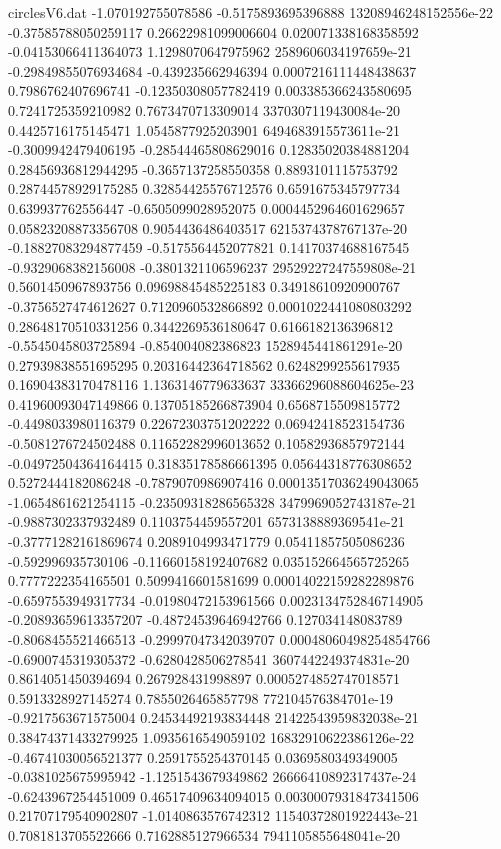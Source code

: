 \begin{filecontents}{circlesV6.dat}
-1.070192755078586	-0.5175893695396888	13208946248152556e-22
-0.37585788050259117	0.26622981099006604	0.020071338168358592
-0.04153066411364073	1.1298070647975962	2589606034197659e-21
-0.29849855076934684	-0.439235662946394	0.0007216111448438637
0.7986762407696741	-0.12350308057782419	0.003385366243580695
0.7241725359210982	0.7673470713309014	3370307119430084e-20
0.4425716175145471	1.0545877925203901	6494683915573611e-21
-0.3009942479406195	-0.28544465808629016	0.12835020384881204
0.28456936812944295	-0.3657137258550358	0.8893101115753792
0.28744578929175285	0.32854425576712576	0.6591675345797734
0.639937762556447	-0.6505099028952075	0.0004452964601629657
0.05823208873356708	0.9054436486403517	6215374378767137e-20
-0.18827083294877459	-0.5175564452077821	0.14170374688167545
-0.9329068382156008	-0.3801321106596237	29529227247559808e-21
0.5601450967893756	0.09698845485225183	0.34918610920900767
-0.3756527474612627	0.7120960532866892	0.0001022441080803292
0.28648170510331256	0.3442269536180647	0.6166182136396812
-0.5545045803725894	-0.854004082386823	1528945441861291e-20
0.27939838551695295	0.20316442364718562	0.6248299255617935
0.16904383170478116	1.1363146779633637	33366296088604625e-23
0.41960093047149866	0.13705185266873904	0.6568715509815772
-0.4498033980116379	0.22672303751202222	0.06942418523154736
-0.5081276724502488	0.11652282996013652	0.10582936857972144
-0.04972504364164415	0.31835178586661395	0.05644318776308652
0.5272444182086248	-0.7879070986907416	0.00013517036249043065
-1.0654861621254115	-0.23509318286565328	3479969052743187e-21
-0.9887302337932489	0.1103754459557201	6573138889369541e-21
-0.37771282161869674	0.2089104993471779	0.05411857505086236
-0.592996935730106	-0.11660158192407682	0.035152664565725265
0.7777222354165501	0.5099416601581699	0.00014022159282289876
-0.6597553949317734	-0.01980472153961566	0.0023134752846714905
-0.20893659613357207	-0.48724539646942766	0.127034148083789
-0.8068455521466513	-0.29997047342039707	0.00048060498254854766
-0.6900745319305372	-0.6280428506278541	3607442249374831e-20
0.8614051450394694	0.267928431998897	0.0005274852747018571
0.5913328927145274	0.7855026465857798	772104576384701e-19
-0.9217563671575004	0.24534492193834448	21422543959832038e-21
0.38474371433279925	1.0935616549059102	16832910622386126e-22
-0.46741030056521377	0.2591755254370145	0.0369580349349005
-0.0381025675995942	-1.1251543679349862	26666410892317437e-24
-0.6243967254451009	0.46517409634094015	0.0030007931847341506
0.21707179540902807	-1.0140863576742312	11540372801922443e-21
0.7081813705522666	0.7162885127966534	7941105855648041e-20

\end{filecontents}
